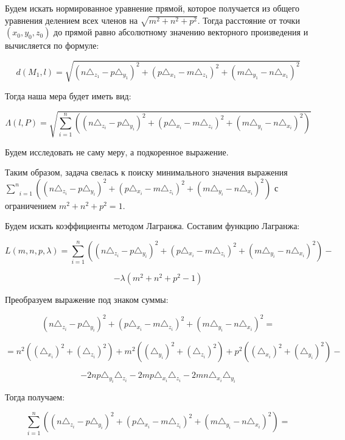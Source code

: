 Будем искать нормированное уравнение прямой, которое получается из общего уравнения делением всех членов на $\sqrt{m^2 + n^2 + p^2}$. Тогда расстояние от точки $(x_0,y_0,z_0)$ до прямой равно абсолютному значению векторного произведения и вычисляется по формуле: 

$$d (M_1, \mathit{l}) = \sqrt{(n \triangle_{z_1} - p \triangle_{y_1})^2 + (p \triangle_{x_1} - m \triangle_{z_1})^2 + (m \triangle_{y_1} - n \triangle_{x_1})^2}$$

Тогда наша мера будет иметь вид:

$$\Lambda (\mathit{l}, P) = \sqrt{\underset{i=1}{\overset{n}{\sum}} \left((n \triangle_{z_i} - p \triangle_{y_i})^2 + (p \triangle_{x_i} - m \triangle_{z_i})^2 + (m \triangle_{y_i} - n \triangle_{x_i})^2 \right)}$$

Будем исследовать не саму меру, а подкоренное выражение.

Таким образом, задача свелась к поиску минимального значения выражения $\underset{i=1}{\overset{n}{\sum}} \left((n \triangle_{z_i} - p \triangle_{y_i})^2 + (p \triangle_{x_i} - m \triangle_{z_i})^2 + (m \triangle_{y_i} - n \triangle_{x_i})^2 \right)$ с ограничением $m^2 + n^2 + p^2=1$.

Будем искать коэффициенты методом Лагранжа. Составим функцию Лагранжа:

$$L(m, n, p, \lambda) = \underset{i=1}{\overset{n}{\sum}} \left((n \triangle_{z_i} - p \triangle_{y_i})^2 + (p \triangle_{x_i} - m \triangle_{z_i})^2 + (m \triangle_{y_i} - n \triangle_{x_i})^2 \right) -$$

$$- \lambda (m^2 + n^2 + p^2-1)$$

Преобразуем выражение под знаком суммы:

$$(n \triangle_{z_i} - p \triangle_{y_i})^2 + (p \triangle_{x_i} - m \triangle_{z_i})^2 + (m \triangle_{y_i} - n \triangle_{x_i})^2 = $$

$$ = n^2 ((\triangle_{x_i})^2 + (\triangle_{z_i})^2) + m^2 ((\triangle_{y_i})^2 + (\triangle_{z_i})^2) + p^2 ((\triangle_{x_i})^2 + (\triangle_{y_i})^2) - $$

$$ - 2 n p \triangle_{y_i} \triangle_{z_i} - 2 m p \triangle_{x_i} \triangle_{z_i} - 2 m n \triangle_{x_i} \triangle_{y_i}$$

Тогда получаем:

$$\underset{i=1}{\overset{n}{\sum}} \left((n \triangle_{z_i} - p \triangle_{y_i})^2 + (p \triangle_{x_i} - m \triangle_{z_i})^2 + (m \triangle_{y_i} - n \triangle_{x_i})^2 \right) = $$

